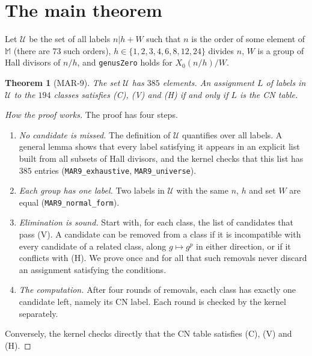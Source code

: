 \documentclass[11pt]{amsart}
\newtheorem{theorem}{Theorem}[section]
\theoremstyle{definition}
\newcommand{\M}{\mathbb{M}}
\newcommand{\U}{\mathcal{U}}
\newcommand{\lean}[1]{\textnormal{\texttt{#1}}}
\newcommand{\leanref}[1]{\par\noindent{\small\textit{Lean:} #1}\par\medskip}
\begin{document}
\section{The main theorem}\label{sec:main}
Let $\U$ be the set of all labels $n|h+W$ such that $n$ is the order of some element of $\M$ (there are $73$ such orders), $h\in\{1,2,3,4,6,8,12,24\}$ divides $n$, $W$ is a group of Hall divisors of $n/h$, and \lean{genusZero} holds for $X_0(n/h)/W$.

\begin{theorem}[MAR-9]\label{thm:mar9}
The set $\U$ has $385$ elements. An assignment $L$ of labels in $\U$ to the $194$ classes satisfies (C), (V) and (H) if and only if $L$ is the CN table.
\end{theorem}
\leanref{\lean{MAR.MAR9}, \lean{MAR.MAR9\_converse}}

\begin{proof}[How the proof works]
The proof has four steps.
\begin{enumerate}
\item \emph{No candidate is missed.} The definition of $\U$ quantifies over all labels. A general lemma shows that every label satisfying it appears in an explicit list built from all subsets of Hall divisors, and the kernel checks that this list has $385$ entries (\lean{MAR9\_exhaustive}, \lean{MAR9\_universe}).
\item \emph{Each group has one label.} Two labels in $\U$ with the same $n$, $h$ and set $W$ are equal (\lean{MAR9\_normal\_form}).
\item \emph{Elimination is sound.} Start with, for each class, the list of candidates that pass (V). A candidate can be removed from a class if it is incompatible with every candidate of a related class, along $g\mapsto g^p$ in either direction, or if it conflicts with (H). We prove once and for all that such removals never discard an assignment satisfying the conditions.
\item \emph{The computation.} After four rounds of removals, each class has exactly one candidate left, namely its CN label. Each round is checked by the kernel separately.
\end{enumerate}
Conversely, the kernel checks directly that the CN table satisfies (C), (V) and (H).
\end{proof}
\end{document}
